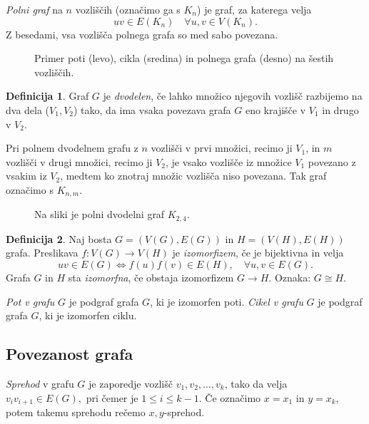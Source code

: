 \documentclass[12pt,a4paper]{amsart}
\theoremstyle{definition} %
\newtheorem{definicija}{Definicija}[section]
\theoremstyle{plain} %
\newcommand{\graf}[1][G]{\ensuremath{#1 = (V(#1), E(#1))}}
\newcommand{\vozlisca}[1][G]{\ensuremath{V(#1)}}
\newcommand{\povezave}[1][G]{\ensuremath{E(#1)}}
\begin{document}
\emph{Polni graf} na $n$ vozliščih (označimo ga s $K_n$) je graf, za katerega velja 
\[ uv \in \povezave[K_n] \quad \forall u,v \in \vozlisca[K_n].\] 
Z besedami, vsa vozlišča polnega grafa so med sabo povezana.

\begin{figure}[h]
    \caption{Primer poti (levo), cikla (sredina) in polnega grafa (desno) na šestih vozliščih.}
\end{figure}

\begin{definicija}
    Graf $G$ je \emph{dvodelen}, če lahko množico njegovih vozlišč razbijemo na dva dela ($V_1,V_2$) tako, da ima vsaka povezava grafa $G$ eno krajišče v $V_1$ in drugo v $V_2$.
\end{definicija}

Pri polnem dvodelnem grafu z $n$ vozlišči v prvi množici, recimo ji $V_1$, in $m$ vozlišči v drugi množici, recimo ji $V_2$, je vsako vozlišče iz množice $V_1$ povezano z vsakim iz $V_2$, medtem ko znotraj množic vozlišča niso povezana. Tak graf označimo s $K_{n,m}$.

\begin{figure}[h]
    \caption{Na sliki je polni dvodelni graf $K_{2,4}$.}
\end{figure}

\begin{definicija}
	Naj bosta $\graf$ in $\graf[H]$ grafa. 
	Preslikava $f\colon \vozlisca \to \vozlisca[H]$ je \emph{izomorfizem}, če je bijektivna in velja
	\[ uv \in \povezave \iff f(u)f(v) \in \povezave[H],\quad \forall u, v \in \povezave. \]
	Grafa $G$ in $H$ sta \emph{izomorfna}, če obstaja izomorfizem $G \to H$. Oznaka: $G \cong H$.
\end{definicija}

\emph{Pot v grafu} $G$ je podgraf grafa $G$, ki je izomorfen poti.
\emph{Cikel v grafu} $G$ je podgraf grafa $G$, ki je izomorfen ciklu. 

\subsection{Povezanost grafa}

\emph{Sprehod} v grafu $G$ je zaporedje vozlišč $v_1, v_2, \ldots, v_k$, tako da velja $v_i v_{i+1} \in E(G),$ pri čemer je $1 \leq i \leq k-1$. Če označimo $x = x_1$ in $y = x_k$, potem takemu sprehodu rečemo $x,y$-sprehod.
\end{document}
